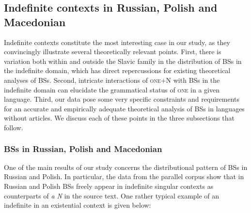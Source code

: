 \documentclass[output=paper,colorlinks,citecolor=brown]{langscibook}
\begin{document}


\subsection {Indefinite contexts in Russian, Polish and Macedonian} \label{Indef discussion}

Indefinite contexts constitute the most interesting case in our study, as they convincingly illustrate several theoretically relevant points. First, there is variation both within and outside the Slavic family in the distribution of BSs in the indefinite domain, which has direct repercussions for existing theoretical analyses of BSs. Second, intricate interactions of \textsc{one}$+$N with BSs in the indefinite domain can elucidate the grammatical status of \textsc{one} in a given language. Third, our data pose some very specific constraints and requirements for an accurate and empirically adequate theoretical analysis of BSs in languages without articles. We discuss each of these points in the three subsections that follow. 

\subsubsection{BSs in Russian, Polish and Macedonian}

One of the main results of our study concerns the distributional pattern of BSs in Russian and Polish. In particular, the data from the parallel corpus show that in Russian and Polish BSs freely appear in indefinite singular contexts as counterparts of \textit{a N} in the source text. One rather typical example of an indefinite in an existential context is given below: 
\end{document}
